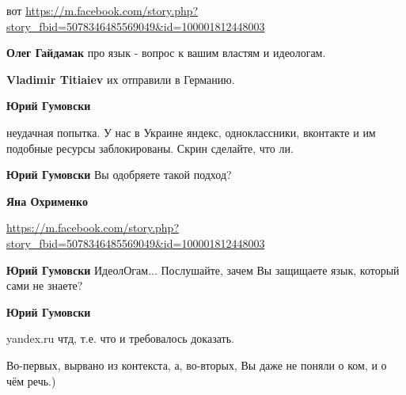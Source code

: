 \begin{itemize}
вот \url{https://m.facebook.com/story.php?story_fbid=5078346485569049&id=100001812448003}


\textbf{Олег Гайдамак} про язык - вопрос к вашим властям и идеологам.


\textbf{Vladimir Titiaiev} их отправили в Германию.


\textbf{Юрий Гумовски} 

неудачная попытка. У нас в Украине яндекс, одноклассники, вконтакте и им
подобные ресурсы заблокированы. Скрин сделайте, что ли.



\textbf{Юрий Гумовски} Вы одобряете такой подход?


\textbf{Яна Охрименко} 

\url{https://m.facebook.com/story.php?story_fbid=5078346485569049&id=100001812448003}


\textbf{Юрий Гумовски} ИдеолОгам... Послушайте, зачем Вы защищаете язык, который сами не знаете?


\textbf{Юрий Гумовски} 

yandex.ru чтд, т.е. что и требовалось доказать.

Во-первых, вырвано из контекста, а, во-вторых, Вы даже не поняли о ком, и о чём
речь.)



\end{itemize}
